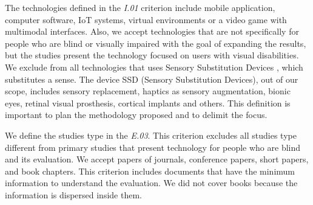 \begin{table}[h]
	\captionsetup{width=16cm}%
    \end{table}

The technologies defined in the \textit{I.01} criterion include mobile application, computer software, IoT systems, virtual environments or a video game with multimodal interfaces. Also, we accept technologies that are not specifically for people who are blind or visually impaired with the goal of expanding the results, but the studies present the technology focused on users with visual disabilities. We exclude from all technologies that uses Sensory Substitution Devices \cite{Pissaloux2017TowardsDevices}, which substitutes a sense. The device SSD (Sensory Substitution Devices), out of our scope, includes sensory replacement, haptics as sensory augmentation, bionic eyes, retinal visual prosthesis, cortical implants and others. This definition is important to plan the methodology proposed and to delimit the focus.

We define the studies type in the \textit{E.03}. This criterion excludes all studies type different from primary studies that present technology for people who are blind and its evaluation. We accept papers of journals, conference papers, short papers, and book chapters. This criterion includes documents that have the minimum information to understand the evaluation. We did not cover books because the information is dispersed inside them.

